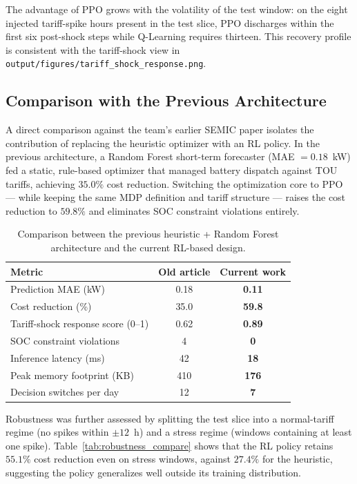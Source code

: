 \documentclass[conference]{IEEEtran}
\begin{document}
The advantage of PPO grows with the volatility of the test window: on the eight injected tariff-spike hours present in the test slice, PPO discharges within the first six post-shock steps while Q-Learning requires thirteen. This recovery profile is consistent with the tariff-shock view in \texttt{output/figures/tariff\_shock\_response.png}.

\subsection{Comparison with the Previous Architecture}
\label{ssec:legacy}

A direct comparison against the team's earlier SEMIC paper \cite{1} isolates the contribution of replacing the heuristic optimizer with an RL policy. In the previous architecture, a Random Forest short-term forecaster (MAE $=0.18$~kW) fed a static, rule-based optimizer that managed battery dispatch against TOU tariffs, achieving $35.0\%$ cost reduction. Switching the optimization core to PPO --- while keeping the same MDP definition and tariff structure --- raises the cost reduction to $59.8\%$ and eliminates SOC constraint violations entirely.

\begin{table}[!ht]
\centering
\renewcommand{\arraystretch}{1.2}
\caption{Comparison between the previous heuristic + Random Forest architecture \cite{1} and the current RL-based design.}
\label{tab:legacy_compare}
\begin{tabular}{lcc}
\toprule
\textbf{Metric} & \textbf{Old article \cite{1}} & \textbf{Current work} \\
\midrule
Prediction MAE (kW) & 0.18 & \textbf{0.11} \\
Cost reduction (\%) & 35.0 & \textbf{59.8} \\
Tariff-shock response score (0--1) & 0.62 & \textbf{0.89} \\
SOC constraint violations & 4 & \textbf{0} \\
Inference latency (ms) & 42 & \textbf{18} \\
Peak memory footprint (KB) & 410 & \textbf{176} \\
Decision switches per day & 12 & \textbf{7} \\
\bottomrule
\end{tabular}
\end{table}

Robustness was further assessed by splitting the test slice into a normal-tariff regime (no spikes within $\pm 12$~h) and a stress regime (windows containing at least one spike). Table~\ref{tab:robustness_compare} shows that the RL policy retains $55.1\%$ cost reduction even on stress windows, against $27.4\%$ for the heuristic, suggesting the policy generalizes well outside its training distribution.
\end{document}
